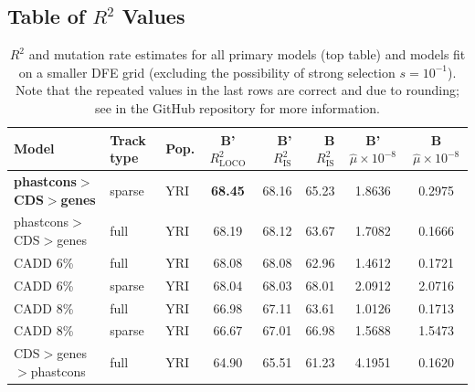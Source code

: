 \documentclass[11pt]{article}
\begin{document}
\subsection{Table of $R^2$ Values}

\begin{table}
    \label{supp:tbl-r2}
\centering
\caption{$R^2$ and mutation rate estimates for all primary models (top table)
    and models fit on a smaller DFE grid (excluding the possibility of strong
    selection $s=10^{-1}$). Note that the repeated values in the last rows are
    correct and due to rounding; see  in the
    GitHub repository for more information.}
\begin{tabular}{lll|crr|cc}
    \textbf{Model} & \textbf{Track type} & \textbf{Pop.} & \textbf{B' $R_\text{LOCO}^2$} & \textbf{B' $R_\text{IS}^2$} & \textbf{B $R_\text{IS}^2$} & \textbf{B' $\hat{\mu} \times 10^{-8}$} & \textbf{B $\hat{\mu} \times 10^{-8}$} \\[0.5ex] 
\hline
\hline
    \textbf{phastcons$>$CDS$>$genes} &            sparse &          YRI &                        \textbf{68.45} &             68.16 &            65.23 &                                 1.8636 &                                0.2975 \\
phastcons$>$CDS$>$genes &              full &          YRI &                        68.19 &             68.12 &            63.67 &                                 1.7082 &                                0.1666 \\
               CADD 6\% &              full &          YRI &                        68.08 &             68.08 &            62.96 &                                 1.4612 &                                0.1721 \\
               CADD 6\% &            sparse &          YRI &                        68.04 &             68.03 &            68.01 &                                 2.0912 &                                2.0716 \\
               CADD 8\% &              full &          YRI &                        66.98 &             67.11 &            63.61 &                                 1.0126 &                                0.1713 \\
               CADD 8\% &            sparse &          YRI &                        66.67 &             67.01 &            66.98 &                                 1.5688 &                                1.5473 \\
CDS$>$genes$>$phastcons &              full &          YRI &                        64.90 &             65.51 &            61.23 &                                 4.1951 &                                0.1620 \\

\end{tabular}
\end{table}
\end{document}
